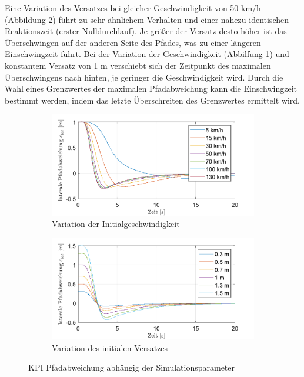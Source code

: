 \noindent Eine Variation des Versatzes bei gleicher Geschwindigkeit von 50 km/h (Abbildung \ref{fig:varOffset_50kmh_s-Error}) führt zu sehr ähnlichem Verhalten und einer nahezu identischen Reaktionszeit (erster Nulldurchlauf). Je größer der Versatz desto höher ist das Überschwingen auf der anderen Seite des Pfades, was zu einer längeren Einschwingzeit führt. Bei der Variation der Geschwindigkeit (Abbilfung \ref{fig:varVelo_1mOffset_s-Error}) und konstantem Versatz von 1 m verschiebt sich der Zeitpunkt des maximalen Überschwingens nach hinten, je geringer die Geschwindigkeit wird.  Durch die Wahl eines Grenzwertes der maximalen Pfadabweichung kann die Einschwingzeit bestimmt werden, indem das letzte Überschreiten des Grenzwertes ermittelt wird.
\begin{figure}[ht]
    \centering
    \begin{subfigure}[b]{.49\textwidth}
        \centering
        \includegraphics[width=\textwidth]{figures/3_Implementierung/Straight_Offset/varVelo_1mOffset_s-Error.pdf}
        \caption{Variation der Initialgeschwindigkeit}
        \label{fig:varVelo_1mOffset_s-Error}
    \end{subfigure}
    \hfill
    \begin{subfigure}[b]{.49\textwidth}
        \centering
        \includegraphics[width=\textwidth]{figures/3_Implementierung/Straight_Offset/varOffset_50kmh_s-Error.pdf}
        \caption{Variation des initialen Versatzes}
        \label{fig:varOffset_50kmh_s-Error}
    \end{subfigure}
    \caption{KPI Pfadabweichung abhängig der Simulationsparameter}
    \label{fig:Straight_Offset_s-Error}
\end{figure}

